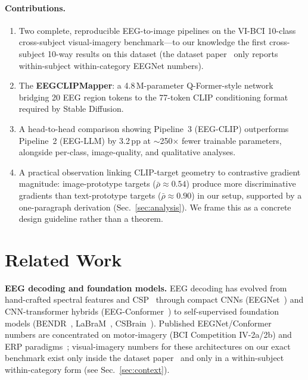 \documentclass{article}
\begin{document}
\paragraph{Contributions.}
\begin{enumerate}[noitemsep,topsep=2pt]
  \item Two complete, reproducible EEG-to-image pipelines on the VI-BCI 10-class cross-subject visual-imagery benchmark---to our knowledge the first cross-subject 10-way results on this dataset (the dataset paper~\citep{figshare_paper} only reports within-subject within-category EEGNet numbers).
  \item The \textbf{EEGCLIPMapper}: a 4.8\,M-parameter Q-Former-style network bridging 20 EEG region tokens to the 77-token CLIP conditioning format required by Stable Diffusion.
  \item A head-to-head comparison showing Pipeline~3 (EEG-CLIP) outperforms Pipeline~2 (EEG-LLM) by 3.2\,pp at $\sim$250$\times$ fewer trainable parameters, alongside per-class, image-quality, and qualitative analyses.
  \item A practical observation linking CLIP-target geometry to contrastive gradient magnitude: image-prototype targets ($\bar{\rho}\!\approx\!0.54$) produce more discriminative gradients than text-prototype targets ($\bar{\rho}\!\approx\!0.90$) in our setup, supported by a one-paragraph derivation (Sec.~\ref{sec:analysis}). We frame this as a concrete design guideline rather than a theorem.
\end{enumerate}

\section{Related Work}

\textbf{EEG decoding and foundation models.} EEG decoding has evolved from hand-crafted spectral features and CSP~\citep{blankertz2007bci} through compact CNNs (EEGNet~\citep{lawhern2018eegnet}) and CNN-transformer hybrids (EEG-Conformer~\citep{song2023eegconformer}) to self-supervised foundation models (BENDR~\citep{kostas2022bendr}, LaBraM~\citep{jiang2024labram}, CSBrain~\citep{zhu2024csbrain}). Published EEGNet/Conformer numbers are concentrated on motor-imagery (BCI Competition IV-2a/2b) and ERP paradigms~\citep{lawhern2018eegnet,song2023eegconformer}; visual-imagery numbers for these architectures on our exact benchmark exist only inside the dataset paper~\citep{figshare_paper} and only in a within-subject within-category form (see Sec.~\ref{sec:context}).
\end{document}
